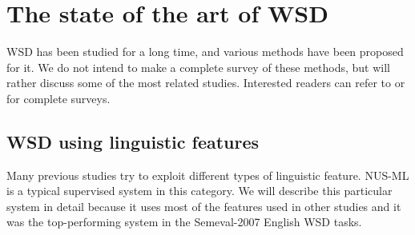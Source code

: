 \documentclass[english]{jnlp_1.4}
\begin{document}
\section{The state of the art of WSD}
\label{sec:The-current-state-art}

WSD has been studied for a long time, and various methods have been
proposed for it. We do not intend to make a complete survey of these
methods, but will rather discuss some of the most related studies.
Interested readers can refer to \cite{IdeOldWSDReview} or \cite{NewWSDSurvey}
for complete surveys. 


\subsection{WSD using linguistic features}
\label{sub:Using-linguistic-features-NUSML}

Many previous studies try to exploit different types of linguistic
feature. NUS-ML \cite{paperCaiELS} is a typical supervised system
in this category. We will describe this particular system in detail
because it uses most of the features used in other studies and it
was the top-performing system in the Semeval-2007 English WSD tasks.
\end{document}
